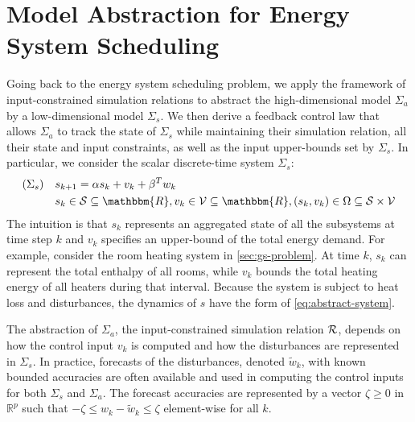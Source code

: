 \section{Model Abstraction for Energy System Scheduling}%
\label{sec:abstraction-gs}

Going back to the %
energy system scheduling problem, we apply the framework of input-constrained simulation relations to abstract the high-dimensional model $\Sigma_{a}$ by a low-dimensional model $\Sigma_{s}$.
We then derive a feedback control law that allows $\Sigma_{a}$ to track the state of $\Sigma_{s}$ while maintaining their simulation relation, all their state and input constraints, as well as the input upper-bounds set by $\Sigma_{s}$.
In particular, we consider the scalar discrete-time system $\Sigma_{s}$:
\begin{align}
  (\Sigma_s) \quad
  & s_{k + 1} = \alpha s_k + v_k + \beta^T w_{k}   \label{eq:abstract-system} \\
  & s_k \in \SSet \subseteq \mathbbm{R},
  v_k \in \VSet \subseteq \mathbbm{R},
  (s_k, v_k) \in \Omega \subseteq \SSet \times \VSet \nonumber
 \end{align}
%
The intuition is that $s_{k}$ represents an aggregated state of all the subsystems at time step $k$ and $v_{k}$ specifies an upper-bound of the total energy demand.
For example, consider the room heating system in \cref{sec:gs-problem}. %
At time $k$, $s_{k}$ can represent the total enthalpy of all rooms, while $v_{k}$ bounds the total heating energy of all heaters during that interval.
Because the system is subject to heat loss and disturbances, the dynamics of $s$ have the form of \eqref{eq:abstract-system}.

The abstraction of $\Sigma_{a}$, \ie the input-constrained simulation relation $\mathcal{R}$, depends on how the control input $v_{k}$ is computed and how the disturbances are represented in $\Sigma_{s}$.
In practice, forecasts of the disturbances, denoted $\tilde{w}_{k}$, with known bounded accuracies are often available and used in computing the control inputs for both $\Sigma_{s}$ and $\Sigma_{a}$.
The forecast accuracies are represented by a vector $\zeta \geq 0$ in $\mathbb{R}^{p}$ such that %
$-\zeta \leqslant w_{k} - \tilde{w}_{k} \leqslant \zeta$ element-wise for all $k$.

